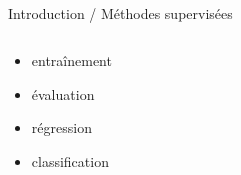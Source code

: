 \begin{frame}{\bititle\\Introduction / Méthodes supervisées}
\begin{columns}\begin{column}{.5\textwidth}

\begin{itemize}
\item<1-> entraînement
\item<2-> évaluation
\item<3-> régression
\item<4-> classification
\end{itemize}

\end{column}\begin{column}{.5\textwidth}


\end{column}\end{columns}
\end{frame}
